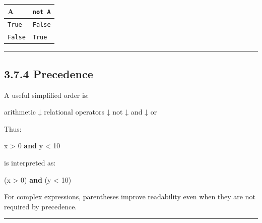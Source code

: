 \documentclass[
  11pt,
  a4paper,
]{article}
\newenvironment{Shaded}{}{}
\newcommand{\DecValTok}[1]{\textcolor[rgb]{0.25,0.63,0.44}{#1}}
\newcommand{\KeywordTok}[1]{\textcolor[rgb]{0.00,0.44,0.13}{\textbf{#1}}}
\newcommand{\NormalTok}[1]{#1}
\newcommand{\OperatorTok}[1]{\textcolor[rgb]{0.40,0.40,0.40}{#1}}
\begin{document}
\begin{longtable}[]{@{}ll@{}}
\toprule\noalign{}
A & \texttt{not\ A} \\
\midrule\noalign{}
\endhead
\bottomrule\noalign{}
\endlastfoot
\texttt{True} & \texttt{False} \\
\texttt{False} & \texttt{True} \\
\end{longtable}

\begin{center}\rule{0.5\linewidth}{0.5pt}\end{center}

\subsection{3.7.4 Precedence}\label{precedence}

A useful simplified order is:

\begin{Shaded}
\begin{Highlighting}[]
\NormalTok{arithmetic}
\NormalTok{   ↓}
\NormalTok{relational operators}
\NormalTok{   ↓}
\NormalTok{not}
\NormalTok{   ↓}
\NormalTok{and}
\NormalTok{   ↓}
\NormalTok{or}
\end{Highlighting}
\end{Shaded}

Thus:

\begin{Shaded}
\begin{Highlighting}[]
\NormalTok{x }\OperatorTok{\textgreater{}} \DecValTok{0} \KeywordTok{and}\NormalTok{ y }\OperatorTok{\textless{}} \DecValTok{10}
\end{Highlighting}
\end{Shaded}

is interpreted as:

\begin{Shaded}
\begin{Highlighting}[]
\NormalTok{(x }\OperatorTok{\textgreater{}} \DecValTok{0}\NormalTok{) }\KeywordTok{and}\NormalTok{ (y }\OperatorTok{\textless{}} \DecValTok{10}\NormalTok{)}
\end{Highlighting}
\end{Shaded}

For complex expressions, parentheses improve readability even when they
are not required by precedence.

\begin{center}\rule{0.5\linewidth}{0.5pt}\end{center}
\end{document}
